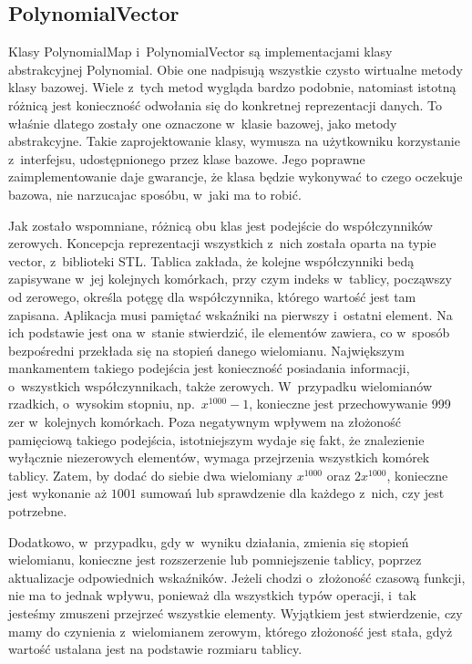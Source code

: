 \subsection{PolynomialVector}

Klasy PolynomialMap i~PolynomialVector są implementacjami klasy abstrakcyjnej Polynomial. Obie one nadpisują wszystkie czysto wirtualne metody klasy bazowej. Wiele z~tych metod wygląda bardzo podobnie, natomiast istotną różnicą jest konieczność odwołania się do konkretnej reprezentacji danych. To właśnie dlatego zostały one oznaczone w~klasie bazowej, jako metody abstrakcyjne. Takie zaprojektowanie klasy, wymusza na użytkowniku korzystanie z~interfejsu, udostępnionego przez klase bazowe. Jego poprawne zaimplementowanie daje gwarancje, że klasa będzie wykonywać to czego oczekuje bazowa, nie narzucajac sposóbu, w~jaki ma to robić.

Jak zostało wspomniane, różnicą obu klas jest podejście do współczynników zerowych. Koncepcja reprezentacji wszystkich z~nich została oparta na typie vector, z~biblioteki STL. Tablica zakłada, że kolejne współczynniki bedą zapisywane w~jej kolejnych komórkach, przy czym indeks w~tablicy, począwszy od zerowego, określa potęgę dla współczynnika, którego wartość jest tam zapisana. Aplikacja musi pamiętać wskaźniki na pierwszy i~ostatni element. Na ich podstawie jest ona w~stanie stwierdzić, ile elementów zawiera, co w~sposób bezpośredni przekłada się na stopień danego wielomianu. Największym mankamentem takiego podejścia jest konieczność posiadania informacji, o~wszystkich współczynnikach, także zerowych. W~przypadku wielomianów rzadkich, o~wysokim stopniu, np.\ $x^{1000}-1$, konieczne jest przechowywanie 999 zer w~kolejnych komórkach. Poza negatywnym wpływem na złożoność pamięciową takiego podejścia, istotniejszym wydaje się fakt, że znalezienie wyłącznie niezerowych elementów, wymaga przejrzenia wszystkich komórek tablicy. Zatem, by dodać do siebie dwa wielomiany $x^{1000}$ oraz $2x^{1000}$, konieczne jest wykonanie aż $1001$ sumowań lub sprawdzenie dla każdego z~nich, czy jest potrzebne.

Dodatkowo, w~przypadku, gdy w~wyniku działania, zmienia się stopień wielomianu, konieczne jest rozszerzenie lub pomniejszenie tablicy, poprzez aktualizacje odpowiednich wskaźników. Jeżeli chodzi o~złożoność czasową funkcji, nie ma to jednak wpływu, ponieważ dla wszystkich typów operacji, i~tak jesteśmy zmuszeni przejrzeć wszystkie elementy. Wyjątkiem jest stwierdzenie, czy mamy do czynienia z~wielomianem zerowym, którego złożoność jest stała, gdyż wartość ustalana jest na podstawie rozmiaru tablicy.

